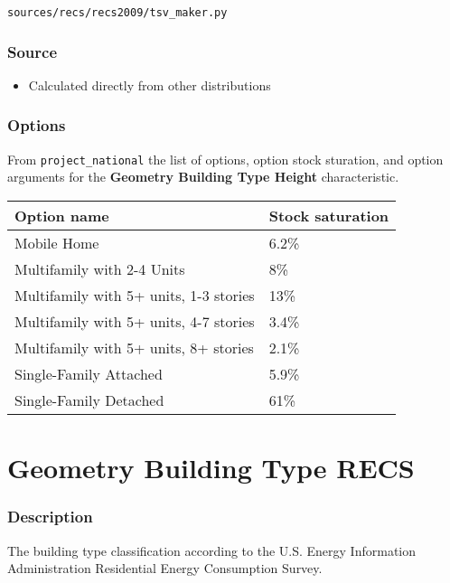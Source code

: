 \texttt{sources/recs/recs2009/tsv\_maker.py}

\subsubsection{Source}\label{source-49}

\begin{itemize}
 
\item
  Calculated directly from other distributions
\end{itemize}

\subsubsection{Options}\label{options-50}

From \texttt{project\_national} the list of options, option stock
sturation, and option arguments for the \textbf{Geometry Building Type
Height} characteristic.

\begin{longtable}[]{@{}ll@{}}
\toprule\noalign{}
Option name & Stock saturation \\
\midrule\noalign{}
\endhead
\bottomrule\noalign{}
\endlastfoot
Mobile Home & 6.2\% \\
Multifamily with 2-4 Units & 8\% \\
Multifamily with 5+ units, 1-3 stories & 13\% \\
Multifamily with 5+ units, 4-7 stories & 3.4\% \\
Multifamily with 5+ units, 8+ stories & 2.1\% \\
Single-Family Attached & 5.9\% \\
Single-Family Detached & 61\% \\
\end{longtable}

\section{Geometry Building Type
RECS}\label{geometry_building_type_recs}

\subsubsection{Description}\label{description-51}

The building type classification according to the U.S. Energy
Information Administration Residential Energy Consumption Survey.

